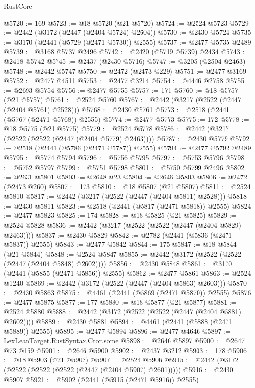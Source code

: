 \begin{lexlean}{RustCore}
\begin{coremodule}
@5720 := 169
@5723 := @18 @5720 (@21 @5720)
@5724 := @2524 @5723
@5729 := @2442 (@3172 (@2447 (@2404 @5724) @2604))
@5730 := @2430 @5724
@5735 := @3170 (@2441 (@5729 (@2471 @5730)) @2555)
@5737 := @2477 @5735 @2489
@5739 := @3168 @5737 @2496
@5742 := @2420 (@5719 @5739) @2434
@5743 := @2418 @5742
@5745 := @2437 (@2430 @5716)
@5747 := @3205 (@2504 @2463)
@5748 := @2442 @5747
@5750 := @2472 (@2473 @229)
@5751 := @2477 @3169
@5752 := @2477 @4511
@5753 := @2477 @3214
@5754 := @4446 @2758
@5755 := @2693 @5754
@5756 := @2477 @5755
@5757 := 171
@5760 := @18 @5757 (@21 @5757)
@5761 := @2524 @5760
@5767 := @2442 (@3217 (@2522 (@2447 (@2404 @5761) @2528)))
@5768 := @2430 @5761
@5773 := @2518 (@2441 (@5767 (@2471 @5768)) @2555)
@5774 := @2477 @5773
@5775 := 172
@5778 := @18 @5775 (@21 @5775)
@5779 := @2524 @5778
@5786 := @2442 (@3217 (@2522 (@2522 (@2447 (@2404 @5779) @2463))))
@5787 := @2430 @5779
@5792 := @2518 (@2441 (@5786 (@2471 @5787)) @2555)
@5794 := @2477 @5792 @2489
@5795 := @5774 @5794
@5796 := @5756 @5795
@5797 := @5753 @5796
@5798 := @5752 @5797
@5799 := @5751 @5798
@5801 := @5750 @5799 @2496
@5802 := @2631 @5801
@5803 := @2648 @23
@5804 := @2646 @5803
@5806 := @2472 (@2473 @260)
@5807 := 173
@5810 := @18 @5807 (@21 @5807)
@5811 := @2524 @5810
@5817 := @2442 (@3217 (@2522 (@2447 (@2404 @5811) @2528)))
@5818 := @2430 @5811
@5823 := @2518 (@2441 (@5817 (@2471 @5818)) @2555)
@5824 := @2477 @5823
@5825 := 174
@5828 := @18 @5825 (@21 @5825)
@5829 := @2524 @5828
@5836 := @2442 (@3217 (@2522 (@2522 (@2447 (@2404 @5829) @2463))))
@5837 := @2430 @5829
@5842 := @2782 (@2441 (@5836 (@2471 @5837)) @2555)
@5843 := @2477 @5842
@5844 := 175
@5847 := @18 @5844 (@21 @5844)
@5848 := @2524 @5847
@5855 := @2442 (@3172 (@2522 (@2522 (@2447 (@2404 @5848) @2602))))
@5856 := @2430 @5848
@5861 := @3170 (@2441 (@5855 (@2471 @5856)) @2555)
@5862 := @2477 @5861
@5863 := @2524 @1240
@5869 := @2442 (@3172 (@2522 (@2447 (@2404 @5863) @2603)))
@5870 := @2430 @5863
@5875 := @4461 (@2441 (@5869 (@2471 @5870)) @2555)
@5876 := @2477 @5875
@5877 := 177
@5880 := @18 @5877 (@21 @5877)
@5881 := @2524 @5880
@5888 := @2442 (@3172 (@2522 (@2522 (@2447 (@2404 @5881) @2602))))
@5889 := @2430 @5881
@5894 := @4461 (@2441 (@5888 (@2471 @5889)) @2555)
@5895 := @2477 @5894
@5896 := @2477 @4646
@5897 := LexLeanTarget.RustSyntax.Ctor.some
@5898 := @2646 @5897
@5900 := @2647 @73 @159
@5901 := @2646 @5900
@5902 := @2437 @3212
@5903 := 178
@5906 := @18 @5903 (@21 @5903)
@5907 := @2524 @5906
@5915 := @2442 (@3172 (@2522 (@2522 (@2522 (@2447 (@2404 @5907) @2601)))))
@5916 := @2430 @5907
@5921 := @5902 (@2441 (@5915 (@2471 @5916)) @2555)

\end{coremodule}
\end{lexlean}
